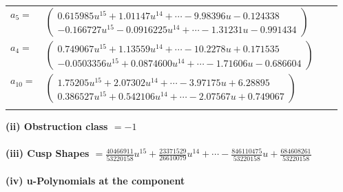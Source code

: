 \documentclass[1p]{elsarticle_modified}
\theoremstyle{definition}
\begin{document}
\begin{tabular}{m{7pt} m{180pt} m{7pt} m{180pt} }
\flushright $a_{5}=$&$\begin{pmatrix}0.615985 u^{15}+1.01147 u^{14}+\cdots-9.98396 u-0.124338\\-0.166727 u^{15}-0.0916225 u^{14}+\cdots-1.31231 u-0.991434\end{pmatrix}$ \\
\flushright $a_{4}=$&$\begin{pmatrix}0.749067 u^{15}+1.13559 u^{14}+\cdots-10.2278 u+0.171535\\-0.0503356 u^{15}+0.0874600 u^{14}+\cdots-1.71606 u-0.686604\end{pmatrix}$ \\
\flushright $a_{10}=$&$\begin{pmatrix}1.75205 u^{15}+2.07302 u^{14}+\cdots-3.97175 u+6.28895\\0.386527 u^{15}+0.542106 u^{14}+\cdots-2.07567 u+0.749067\end{pmatrix}$\\&\end{tabular}
\flushleft \textbf{(ii) Obstruction class $= -1$}\\~\\
\flushleft \textbf{(iii) Cusp Shapes $= \frac{40466911}{53220158} u^{15}+\frac{23371529}{26610079} u^{14}+\cdots-\frac{846110475}{53220158} u+\frac{684608261}{53220158}$}\\~\\
\newpage\renewcommand{\arraystretch}{1}
\flushleft \textbf{(iv) u-Polynomials at the component}\newline \\
\end{document}
